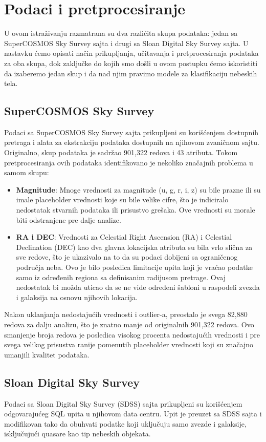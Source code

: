 \documentclass[a4paper,12pt]{article}
\begin{document}
\section{Podaci i pretprocesiranje}
U ovom istraživanju razmatrana su dva različita skupa podataka: jedan sa SuperCOSMOS Sky Survey sajta i drugi sa Sloan Digital Sky Survey sajta. U nastavku ćemo opisati način prikupljanja, učitavanja i pretprocesiranja podataka za oba skupa, dok zaključke do kojih smo došli u ovom postupku ćemo iskoristiti da izaberemo jedan skup i da nad njim pravimo modele za klasifikaciju nebeskih tela.

\subsection{SuperCOSMOS Sky Survey}
Podaci sa SuperCOSMOS Sky Survey sajta prikupljeni su korišćenjem dostupnih pretraga i alata za ekstrakciju podataka dostupnih na njihovom zvaničnom sajtu. Originalno, skup podataka je sadržao 901,322 redova i 43 atributa.
Tokom pretprocesiranja ovih podataka identifikovano je nekoliko značajnih problema u samom skupu:
\begin{itemize}
    \item \textbf{Magnitude}: Mnoge vrednosti za magnitude (u, g, r, i, z) su bile prazne ili su imale placeholder vrednosti koje su bile velike cifre, što je indiciralo nedostatak stvarnih podataka ili prisustvo grešaka. Ove vrednosti su morale biti odstranjene pre dalje analize.
    \item \textbf{RA i DEC}: Vrednosti za Celestial Right Ascension (RA) i Celestial Declination (DEC) kao dva glavna lokacijska atributa su bila vrlo slična za sve redove, što je ukazivalo na to da su podaci dobijeni sa ograničenog područja neba. Ovo je bilo posledica limitacije upita  koji je vraćao podatke samo iz određenih regiona sa definisanim radijusom pretrage. Ovaj nedostatak bi možda uticao da se ne vide određeni šabloni u raspodeli zvezda i galaksija na osnovu njihovih lokacija.
\end{itemize}

Nakon uklanjanja nedostajućih vrednosti i outlier-a, preostalo je svega 82,880 redova za dalju analizu, što je znatno manje od originalnih 901,322 redova. Ovo smanjenje broja redova je posledica visokog procenta nedostajućih vrednosti i pre svega velikog prisustva ranije pomenutih placeholder vrednosti  koji su značajno umanjili kvalitet podataka.

\subsection{Sloan Digital Sky Survey}
Podaci sa Sloan Digital Sky Survey (SDSS) sajta prikupljeni su korišćenjem odgovarajućeg SQL upita u njihovom data centru. Upit je preuzet sa SDSS sajta i modifikovan tako da obuhvati podatke koji uključuju samo zvezde i galaksije, isključujući quasare kao tip nebeskih objekata.
\end{document}

